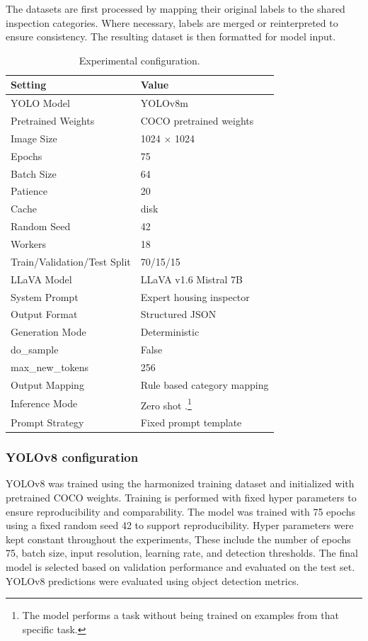The datasets are first processed by mapping their original labels to the shared inspection categories. Where necessary, labels are merged or reinterpreted to ensure consistency. The resulting dataset is then formatted for model input.

\begin{table}[h]
\caption{Experimental configuration.}
\label{tab:experimental_setup}
\centering
\footnotesize
\begin{tabularx}{\columnwidth}{l X}
\toprule
Setting & Value \\
\midrule
YOLO Model & YOLOv8m \\
Pretrained Weights & COCO pretrained weights \\
Image Size & 1024 $\times$ 1024 \\
Epochs & 75 \\
Batch Size & 64 \\
Patience & 20 \\
Cache & disk \\
Random Seed & 42 \\
Workers & 18 \\
Train/Validation/Test Split & 70/15/15 \\
LLaVA Model & LLaVA v1.6 Mistral 7B \\
System Prompt & Expert housing inspector \\
Output Format & Structured JSON \\
Generation Mode & Deterministic \\
do\_sample & False \\
max\_new\_tokens & 256 \\
Output Mapping & Rule based category mapping \\
Inference Mode & Zero shot .\footnote{The model performs a task without being trained on examples from that specific task.} \\
Prompt Strategy & Fixed prompt template \\
\bottomrule
\end{tabularx}
\end{table}

%                              
\subsubsection{YOLOv8 configuration}

YOLOv8 was trained using the harmonized training dataset and initialized with pretrained COCO weights\cite{jocher_ultralytics_2023}. Training is performed with fixed hyper parameters to ensure reproducibility and comparability. The model was trained with 75 epochs using a fixed random seed 42 to support reproducibility. Hyper parameters were kept constant throughout the experiments, These include the number of epochs 75, batch size, input resolution, learning rate, and detection thresholds. The final model is selected based on validation performance and evaluated on the test set. YOLOv8 predictions were evaluated using object detection metrics. 

